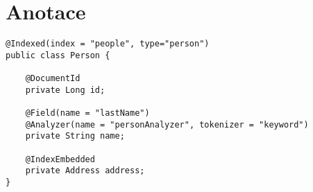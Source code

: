 \documentclass[11pt,oneside]{fithesis2}
\begin{document}

\section{Anotace}
\label{EsAnnotationsAnotace}
\begin{lstlisting}[caption =  Užití anotací Elasticsearch-Annotations, label = AnnotationsExample]
@Indexed(index = "people", type="person")
public class Person {

	@DocumentId
	private Long id;

	@Field(name = "lastName")
	@Analyzer(name = "personAnalyzer", tokenizer = "keyword")
	private String name;

	@IndexEmbedded
	private Address address;
}
\end{lstlisting}
\end{document}
